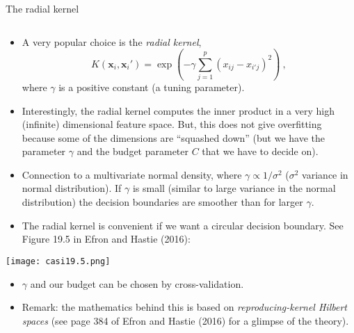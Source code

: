 \documentclass[10pt,ignorenonframetext,]{beamer}
\providecommand{\tightlist}{%
  \setlength{\itemsep}{0pt}\setlength{\parskip}{0pt}}
\begin{document}
\begin{frame}

\begin{block}{The radial kernel}

\(~\)

\begin{itemize}
\tightlist
\item
  A very popular choice is the \emph{radial kernel}, \[
  K({\boldsymbol x}_i,{\boldsymbol x}_i')=\exp(-\gamma \sum_{j=1}^p (x_{ij}-x_{i'j})^2) \ ,
  \] where \(\gamma\) is a positive constant (a tuning parameter).
\end{itemize}

\vspace{1mm}

\begin{itemize}
\tightlist
\item
  Interestingly, the radial kernel computes the inner product in a very
  high (infinite) dimensional feature space. But, this does not give
  overfitting because some of the dimensions are ``squashed down'' (but
  we have the parameter \(\gamma\) and the budget parameter \(C\) that
  we have to decide on).
\end{itemize}

\vspace{1mm}

\begin{itemize}
\tightlist
\item
  Connection to a multivariate normal density, where
  \(\gamma \propto 1/\sigma^2\) (\(\sigma^2\) variance in normal
  distribution). If \(\gamma\) is small (similar to large variance in
  the normal distribution) the decision boundaries are smoother than for
  larger \(\gamma\).
\end{itemize}

\end{block}

\end{frame}

\begin{frame}

\begin{itemize}
\tightlist
\item
  The radial kernel is convenient if we want a circular decision
  boundary. See Figure 19.5 in Efron and Hastie (2016): \vspace{2mm}
\end{itemize}

\texttt{[image: casi19.5.png]}

\begin{itemize}
\item
  \(\gamma\) and our budget can be chosen by cross-validation.
\item
  Remark: the mathematics behind this is based on
  \emph{reproducing-kernel Hilbert spaces} (see page 384 of Efron and
  Hastie (2016) for a glimpse of the theory).
\end{itemize}

\end{frame}
\end{document}
